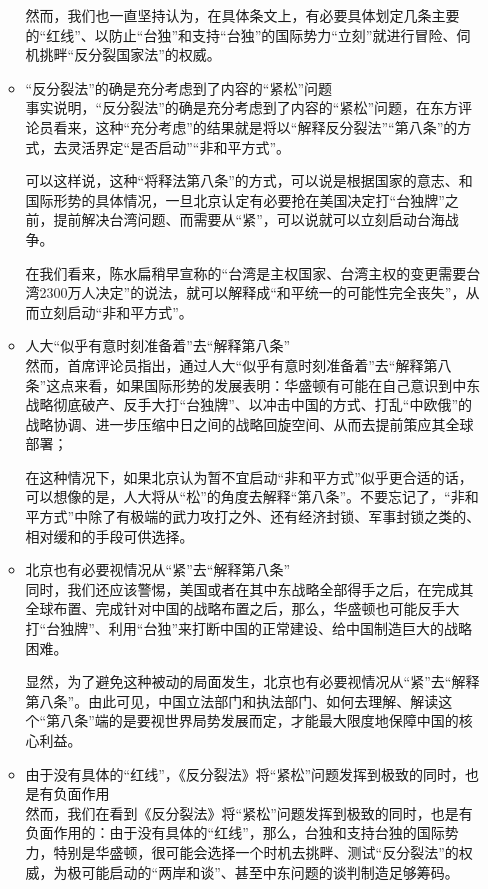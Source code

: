 \documentclass[a4paper,11pt]{article}
\begin{document}
\begin{itemize}
\begin{itemize}
    然而，我们也一直坚持认为，在具体条文上，有必要具体划定几条主要的“红线”、以防止“台独”和支持“台独”的国际势力“立刻”就进行冒险、伺机挑畔“反分裂国家法”的权威。
 

\item “反分裂法”的确是充分考虑到了内容的“紧松”问题\\
\label{sec-2_1_5}%
事实说明，“反分裂法”的确是充分考虑到了内容的“紧松”问题，在东方评论员看来，这种“充分考虑”的结果就是将以“解释反分裂法”“第八条”的方式，去灵活界定“是否启动”“非和平方式”。

    可以这样说，这种“将释法第八条”的方式，可以说是根据国家的意志、和国际形势的具体情况，一旦北京认定有必要抢在美国决定打“台独牌”之前，提前解决台湾问题、而需要从“紧”，可以说就可以立刻启动台海战争。

    在我们看来，陈水扁稍早宣称的“台湾是主权国家、台湾主权的变更需要台湾2300万人决定”的说法，就可以解释成“和平统一的可能性完全丧失”，从而立刻启动“非和平方式”。
 
 

\item 人大“似乎有意时刻准备着”去“解释第八条”\\
\label{sec-2_1_6}%
然而，首席评论员指出，通过人大“似乎有意时刻准备着”去“解释第八条”这点来看，如果国际形势的发展表明：华盛顿有可能在自己意识到中东战略彻底破产、反手大打“台独牌”、以冲击中国的方式、打乱“中欧俄”的战略协调、进一步压缩中日之间的战略回旋空间、从而去提前策应其全球部署；

    在这种情况下，如果北京认为暂不宜启动“非和平方式”似乎更合适的话，可以想像的是，人大将从“松”的角度去解释“第八条”。不要忘记了，“非和平方式”中除了有极端的武力攻打之外、还有经济封锁、军事封锁之类的、相对缓和的手段可供选择。
 

\item 北京也有必要视情况从“紧”去“解释第八条”\\
\label{sec-2_1_7}%
同时，我们还应该警惕，美国或者在其中东战略全部得手之后，在完成其全球布置、完成针对中国的战略布置之后，那么，华盛顿也可能反手大打“台独牌”、利用“台独”来打断中国的正常建设、给中国制造巨大的战略困难。

    显然，为了避免这种被动的局面发生，北京也有必要视情况从“紧”去“解释第八条”。由此可见，中国立法部门和执法部门、如何去理解、解读这个“第八条”端的是要视世界局势发展而定，才能最大限度地保障中国的核心利益。
 

\item 由于没有具体的“红线”，《反分裂法》将“紧松”问题发挥到极致的同时，也是有负面作用\\
\label{sec-2_1_8}%
然而，我们在看到《反分裂法》将“紧松”问题发挥到极致的同时，也是有负面作用的：由于没有具体的“红线”，那么，台独和支持台独的国际势力，特别是华盛顿，很可能会选择一个时机去挑畔、测试“反分裂法”的权威，为极可能启动的“两岸和谈”、甚至中东问题的谈判制造足够筹码。
 


\end{itemize}
\end{itemize}
\end{document}

